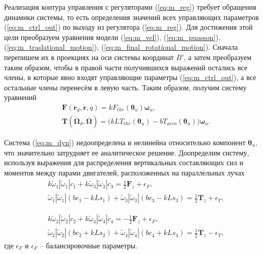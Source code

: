 Реализация контура управления с регуляторами (\ref{eq:m_reg}) требует обращения динамики системы, то есть определения значений всех управляющих параметров (\ref{eq:m_ctrl_out}) по выходу из регулятора (\ref{eq:m_reg}).
Для достижения этой цели преобразуем уравнения модели (\ref{eq:m_vel}), (\ref{eq:m_puasson}), (\ref{eq:m_traslational_motion}), (\ref{eq:m_final_rotational_motion}).
Сначала перепишем их в проекциях на оси системы координат $B'$, а затем
преобразуем таким образом, чтобы в правой части получившихся выражений остались все члены, в которые явно входят управляющие параметры (\ref{eq:m_ctrl_out}), а все остальные члены перенесём в левую часть. Таким образом, получим систему уравнений
\begin{equation} \label{eq:m_dyn}
\begin{aligned}
&\bm F(\ddot{\bm r}_d, \dot{\bm r}, q) = k F_{thr} (\bm \theta_u) \bm \omega_u,\\
&\bm T(\dot{\bm \Omega}_d, \bm\Omega) = \Big(
kLT_{thr}(\bm\theta_u) - bT_{aero}(\bm\theta_u)
\Big)
\bm \omega_u.
\end{aligned}
\end{equation}

Система (\ref{eq:m_dyn}) недоопределена и нелинейна относительно компонент $\bm \theta_u$, что значительно затрудняет ее аналитическое решение. Доопределим систему, используя выражения для распределения вертикальных составляющих сил и моментов между парами двигателей, расположенных на параллельных лучах
\begin{equation} \label{eq:m_dyn_balance_1}
\begin{aligned}
&k \tilde\omega_1 |\tilde\omega_1| c_1 + k \tilde\omega_3 |\tilde\omega_3| c_3 =
\frac{1}{2} \bm F_z + \epsilon_F,
\\
&\tilde\omega_1 |\tilde\omega_1| (bc_1 - kLs_1)
+ \tilde\omega_3 |\tilde\omega_3| (bc_3 - kLs_3) =
\frac{1}{2} \bm T_z + \epsilon_T,
\end{aligned}
\end{equation}

\begin{equation} \label{eq:m_dyn_balance_2}
\begin{aligned}
&k \tilde\omega_2 |\tilde\omega_2| c_2 + k \tilde\omega_4 |\tilde\omega_4| c_4 =
-\frac{1}{2} \bm F_z + \epsilon_F,
\\
&\tilde\omega_2 |\tilde\omega_2| (bc_2 + kLs_2)
+ \tilde\omega_4 |\tilde\omega_4| (bc_4 + kLs_4) =
\frac{1}{2} \bm T_z - \epsilon_T,
\end{aligned}
\end{equation}
где $\epsilon_F$ и $\epsilon_F$ -- балансировочные параметры.

